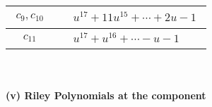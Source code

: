 \documentclass[1p]{elsarticle_modified}
\theoremstyle{definition}
\begin{document}
\begin{tabular}{m{50pt}|m{274pt}}
\hline $$\begin{aligned}c_{9},c_{10}\end{aligned}$$&$\begin{aligned}
&u^{17}+11 u^{15}+\cdots+2 u-1
\end{aligned}$\\
\hline $$\begin{aligned}c_{11}\end{aligned}$$&$\begin{aligned}
&u^{17}+u^{16}+\cdots- u-1
\end{aligned}$\\
\hline
\end{tabular}\\~\\
\newpage\renewcommand{\arraystretch}{1}
\flushleft \textbf{(v) Riley Polynomials at the component}\newline \\
\end{document}
